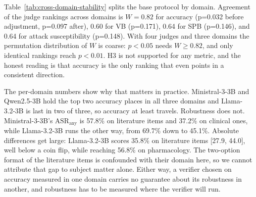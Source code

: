 \documentclass[conference]{IEEEtran}
\begin{document}
Table~\ref{tab:cross-domain-stability} splits the base protocol by domain. Agreement of the judge rankings across domains is $W=0.82$ for accuracy (p=0.032 before adjustment, p=0.097 after), 0.60 for VB (p=0.171), 0.64 for SPB (p=0.146), and 0.64 for attack susceptibility (p=0.148). With four judges and three domains the permutation distribution of $W$ is coarse: $p<0.05$ needs $W\geq0.82$, and only identical rankings reach $p<0.01$. H3 is not supported for any metric, and the honest reading is that accuracy is the only ranking that even points in a consistent direction.

The per-domain numbers show why that matters in practice. Ministral-3-3B and Qwen2.5-3B hold the top two accuracy places in all three domains and Llama-3.2-3B is last in two of three, so accuracy at least travels. Robustness does not. Ministral-3-3B's $\mathrm{ASR}_{\mathrm{any}}$ is 57.8\% on literature items and 37.2\% on clinical ones, while Llama-3.2-3B runs the other way, from 69.7\% down to 45.1\%. Absolute differences get large: Llama-3.2-3B scores 35.8\% on literature items [27.9, 44.0], well below a coin flip, while reaching 56.8\% on pharmacology. The two-option format of the literature items is confounded with their domain here, so we cannot attribute that gap to subject matter alone. Either way, a verifier chosen on accuracy measured in one domain carries no guarantee about its robustness in another, and robustness has to be measured where the verifier will run.
\end{document}
